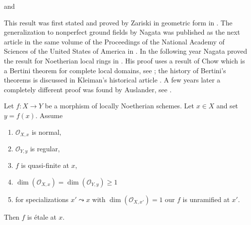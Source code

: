 \begin{lemma}
\label{lemma-purity}
\begin{reference}
\cite{Nagata-Purity} and \cite[Exp. X, Thm. 3.1]{SGA1}
\end{reference}
\begin{history}
This result was first stated and proved by Zariski in
geometric form in \cite{Zariski-Purity}.
The generalization to nonperfect ground fields by Nagata
was published as the next article in the same volume of the
Proceedings of the National Academy of Sciences of the United States of America
in \cite{Nagata-Remarks-Purity}. In the following year Nagata
proved the result for Noetherian local rings in \cite{Nagata-Purity}.
His proof uses a result of Chow which is a Bertini theorem for
complete local domains, see \cite{Chow-Bertini};
the history of Bertini's theorems is discussed in
Kleiman's historical article \cite{Kleiman-Bertini}.
A few years later a completely different proof was found by
Auslander, see \cite{Auslander-Purity}.
\end{history}
Let $f : X \to Y$ be a morphism of locally Noetherian schemes.
Let $x \in X$ and set $y = f(x)$. Assume
\begin{enumerate}
\item $\mathcal{O}_{X, x}$ is normal,
\item $\mathcal{O}_{Y, y}$ is regular,
\item $f$ is quasi-finite at $x$,
\item $\dim(\mathcal{O}_{X, x}) = \dim(\mathcal{O}_{Y, y}) \geq 1$
\item for specializations $x' \leadsto x$ with
$\dim(\mathcal{O}_{X, x'}) = 1$ our $f$ is unramified at $x'$.
\end{enumerate}
Then $f$ is \'etale at $x$.
\end{lemma}

